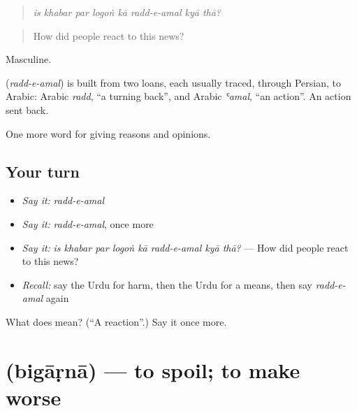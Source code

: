 \begin{quote}
        
\end{quote}

\begin{quote}
\emph{is khabar par logoṅ kā radd-e-amal kyā thā?}
\end{quote}

\begin{quote}
How did people react to this news?
\end{quote}

Masculine.

\begin{cousinweb}
\textbf{ } (\emph{radd-e-amal}) is built from two loans, each usually traced, through Persian, to Arabic: Arabic \emph{radd}, \textquotedblleft{}a turning back\textquotedblright{}, and Arabic \emph{ʿamal}, \textquotedblleft{}an action\textquotedblright{}. An action sent back.
\end{cousinweb}

\begin{grammarlens}[title={What you've built}]
One more word for giving reasons and opinions.
\end{grammarlens}

\subsection*{Your turn}
\begin{itemize}
\raggedright
  \item \emph{Say it:} \emph{radd-e-amal}
  \item \emph{Say it:} \emph{radd-e-amal}, once more
  \item \emph{Say it:} \emph{is khabar par logoṅ kā radd-e-amal kyā thā?} — How did people react to this news?
  \item \emph{Recall:} say the Urdu for harm, then the Urdu for a means, then say \emph{radd-e-amal} again
\end{itemize}

\begin{tcolorbox}[breakable,colback=teal!4,colframe=teal!35!black,title={Before you move on}]
What does   mean? (\textquotedblleft{}A reaction\textquotedblright{}.) Say it once more.
\end{tcolorbox}
\section[\texorpdfstring{\ur{بگاڑنا} (bigāṛnā)}{بگاڑنا (bigāṛnā)}]{ (bigāṛnā) — to spoil; to make worse}

